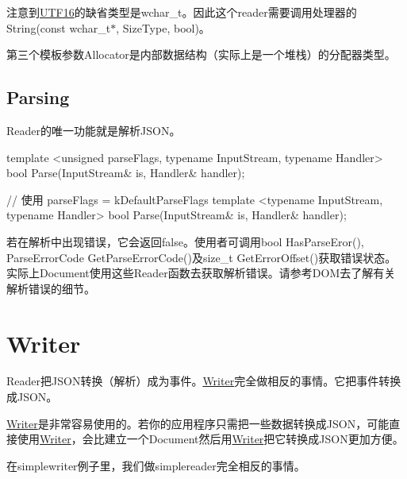注意到{\ttfamily \hyperlink{struct_u_t_f16}{U\+T\+F16}}的缺省类型是{\ttfamily wchar\+\_\+t}。因此这个{\ttfamily reader}需要调用处理器的{\ttfamily String(const wchar\+\_\+t$\ast$, Size\+Type, bool)}。

第三个模板参数{\ttfamily Allocator}是内部数据结构（实际上是一个堆栈）的分配器类型。\hypertarget{md_Cadriciel_Commun_Externe_RapidJSON_doc_sax.zh-cn_Parsing}{}\subsection{Parsing}\label{md_Cadriciel_Commun_Externe_RapidJSON_doc_sax.zh-cn_Parsing}
{\ttfamily Reader}的唯一功能就是解析\+J\+S\+O\+N。


\begin{DoxyCode}
\textcolor{keyword}{template} <\textcolor{keywordtype}{unsigned} parseFlags, \textcolor{keyword}{typename} InputStream, \textcolor{keyword}{typename} Handler>
\textcolor{keywordtype}{bool} Parse(InputStream& is, Handler& handler);

\textcolor{comment}{// 使用 parseFlags = kDefaultParseFlags}
\textcolor{keyword}{template} <\textcolor{keyword}{typename} InputStream, \textcolor{keyword}{typename} Handler>
\textcolor{keywordtype}{bool} Parse(InputStream& is, Handler& handler);
\end{DoxyCode}


若在解析中出现错误，它会返回{\ttfamily false}。使用者可调用{\ttfamily bool Has\+Parse\+Eror()}, {\ttfamily Parse\+Error\+Code Get\+Parse\+Error\+Code()}及{\ttfamily size\+\_\+t Get\+Error\+Offset()}获取错误状态。实际上{\ttfamily Document}使用这些{\ttfamily Reader}函数去获取解析错误。请参考D\+OM去了解有关解析错误的细节。\hypertarget{md_Cadriciel_Commun_Externe_RapidJSON_doc_sax.zh-cn_Writer}{}\section{Writer}\label{md_Cadriciel_Commun_Externe_RapidJSON_doc_sax.zh-cn_Writer}
{\ttfamily Reader}把\+J\+S\+O\+N转换（解析）成为事件。{\ttfamily \hyperlink{class_writer}{Writer}}完全做相反的事情。它把事件转换成\+J\+S\+O\+N。

{\ttfamily \hyperlink{class_writer}{Writer}}是非常容易使用的。若你的应用程序只需把一些数据转换成\+J\+S\+O\+N，可能直接使用{\ttfamily \hyperlink{class_writer}{Writer}}，会比建立一个{\ttfamily Document}然后用{\ttfamily \hyperlink{class_writer}{Writer}}把它转换成\+J\+S\+O\+N更加方便。

在{\ttfamily simplewriter}例子里，我们做{\ttfamily simplereader}完全相反的事情。


